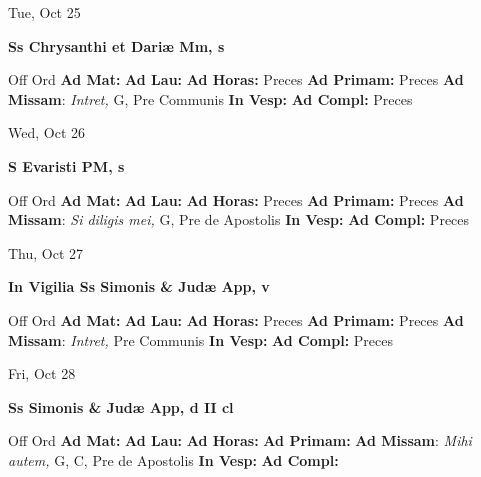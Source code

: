 \documentclass[10pt]{article}
\begin{document}
\begin{minipage}{3.5in}
\vspace{2em}\begin{center}
Tue, Oct 25
\end{center}\textbf{ \large Ss Chrysanthi et Dariæ Mm, \textnormal{\normalsize s}}
\begin{justify}
Off Ord
\textbf{Ad Mat: }
\textbf{Ad Lau: }
\textbf{Ad Horas: }Preces
\textbf{Ad Primam: }Preces
\textbf{Ad Missam}: \textit{Intret,} G, Pre Communis
\textbf{In Vesp: }
\textbf{Ad Compl: }Preces\end{justify}
\end{minipage}



\begin{minipage}{3.5in}
\vspace{2em}\begin{center}
Wed, Oct 26
\end{center}\textbf{ \large S Evaristi PM, \textnormal{\normalsize s}}
\begin{justify}
Off Ord
\textbf{Ad Mat: }
\textbf{Ad Lau: }
\textbf{Ad Horas: }Preces
\textbf{Ad Primam: }Preces
\textbf{Ad Missam}: \textit{Si diligis mei,} G, Pre de Apostolis
\textbf{In Vesp: }
\textbf{Ad Compl: }Preces\end{justify}
\end{minipage}



\begin{minipage}{3.5in}
\vspace{2em}\begin{center}
Thu, Oct 27
\end{center}\textbf{ \large In Vigilia Ss Simonis \& Judæ App, \textnormal{\normalsize v}}
\begin{justify}
Off Ord
\textbf{Ad Mat: }
\textbf{Ad Lau: }
\textbf{Ad Horas: }Preces
\textbf{Ad Primam: }Preces
\textbf{Ad Missam}: \textit{Intret,} Pre Communis
\textbf{In Vesp: }
\textbf{Ad Compl: }Preces\end{justify}
\end{minipage}



\begin{minipage}{3.5in}
\vspace{2em}\begin{center}
Fri, Oct 28
\end{center}\textbf{ \large Ss Simonis \& Judæ App, \textnormal{\normalsize d II cl}}
\begin{justify}
Off Ord
\textbf{Ad Mat: }
\textbf{Ad Lau: }
\textbf{Ad Horas: }
\textbf{Ad Primam: }
\textbf{Ad Missam}: \textit{Mihi autem,} G, C, Pre de Apostolis
\textbf{In Vesp: }
\textbf{Ad Compl: }\end{justify}
\end{minipage}
\end{document}
